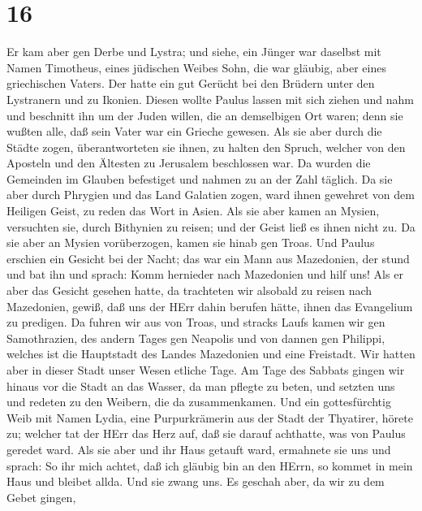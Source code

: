 \hypertarget{section-15}{%
\section{16}\label{section-15}}

 Er kam aber gen Derbe und Lystra; und siehe, ein Jünger war
daselbst mit Namen Timotheus, eines jüdischen Weibes Sohn, die war
gläubig, aber eines griechischen Vaters.  Der hatte ein gut
Gerücht bei den Brüdern unter den Lystranern und zu Ikonien.
 Diesen wollte Paulus lassen mit sich ziehen und nahm und
beschnitt ihn um der Juden willen, die an demselbigen Ort waren; denn
sie wußten alle, daß sein Vater war ein Grieche gewesen. 
Als sie aber durch die Städte zogen, überantworteten sie ihnen, zu
halten den Spruch, welcher von den Aposteln und den Ältesten zu
Jerusalem beschlossen war.  Da wurden die Gemeinden im
Glauben befestiget und nahmen zu an der Zahl täglich.  Da
sie aber durch Phrygien und das Land Galatien zogen, ward ihnen gewehret
von dem Heiligen Geist, zu reden das Wort in Asien.  Als sie
aber kamen an Mysien, versuchten sie, durch Bithynien zu reisen; und der
Geist ließ es ihnen nicht zu.  Da sie aber an Mysien
vorüberzogen, kamen sie hinab gen Troas.  Und Paulus
erschien ein Gesicht bei der Nacht; das war ein Mann aus Mazedonien, der
stund und bat ihn und sprach: Komm hernieder nach Mazedonien und hilf
uns!  Als er aber das Gesicht gesehen hatte, da trachteten
wir alsobald zu reisen nach Mazedonien, gewiß, daß uns der HErr dahin
berufen hätte, ihnen das Evangelium zu predigen.  Da fuhren
wir aus von Troas, und stracks Laufs kamen wir gen Samothrazien, des
andern Tages gen Neapolis  und von dannen gen Philippi,
welches ist die Hauptstadt des Landes Mazedonien und eine Freistadt. Wir
hatten aber in dieser Stadt unser Wesen etliche Tage.  Am
Tage des Sabbats gingen wir hinaus vor die Stadt an das Wasser, da man
pflegte zu beten, und setzten uns und redeten zu den Weibern, die da
zusammenkamen.  Und ein gottesfürchtig Weib mit Namen
Lydia, eine Purpurkrämerin aus der Stadt der Thyatirer, hörete zu;
welcher tat der HErr das Herz auf, daß sie darauf achthatte, was von
Paulus geredet ward.  Als sie aber und ihr Haus getauft
ward, ermahnete sie uns und sprach: So ihr mich achtet, daß ich gläubig
bin an den HErrn, so kommet in mein Haus und bleibet allda. Und sie
zwang uns.  Es geschah aber, da wir zu dem Gebet gingen,
